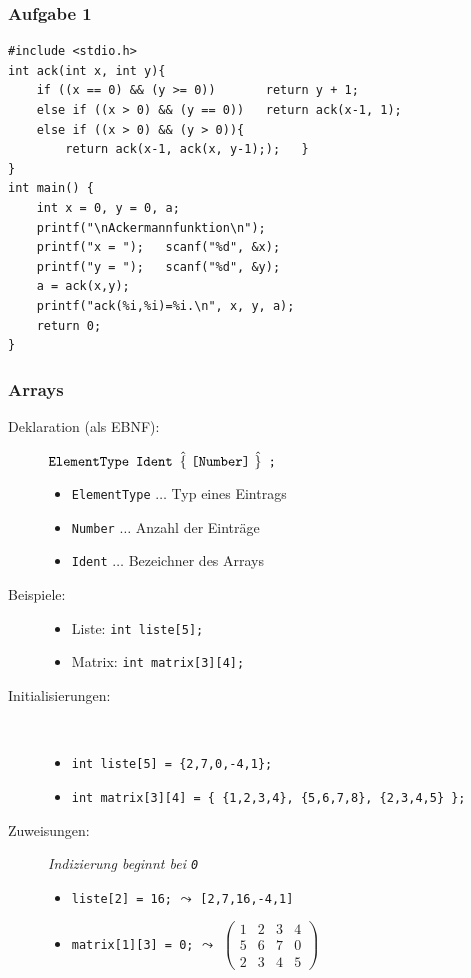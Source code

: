 \documentclass{beamer}
\begin{document}
\begin{frame}[fragile] \frametitle{Aufgabe 1}
	\footnotesize
\begin{lstlisting}
#include <stdio.h>
int ack(int x, int y){
	if ((x == 0) && (y >= 0))       return y + 1;
	else if ((x > 0) && (y == 0))   return ack(x-1, 1);
	else if ((x > 0) && (y > 0)){
		return ack(x-1, ack(x, y-1););   }
}
int main() {
	int x = 0, y = 0, a;
	printf("\nAckermannfunktion\n");
	printf("x = ");   scanf("%d", &x);
	printf("y = ");   scanf("%d", &y);
	a = ack(x,y);
	printf("ack(%i,%i)=%i.\n", x, y, a);
	return 0;
}
\end{lstlisting}
\end{frame}

\begin{frame}[fragile] \frametitle{Arrays}
	\small
	\begin{description}
		\item[Deklaration (als EBNF):]
		$\texttt{ElementType} \enskip \texttt{Ident} \enskip \hat{\{} \ \texttt{[} \texttt{Number} \texttt{]} \ \hat{\}}\enskip  \texttt{;}$
		\begin{itemize}
			\item \texttt{ElementType} $\dots$ Typ eines Eintrags
			\item \texttt{Number} $\dots$ Anzahl der Einträge
			\item \texttt{Ident} $\dots$ Bezeichner des Arrays
		\end{itemize}
		\pause
		\item[Beispiele:]
		\begin{itemize}
			\item Liste: \lstinline{int liste[5];}
			\item Matrix: \lstinline{int matrix[3][4];}
		\end{itemize}
		\pause
		\item[Initialisierungen:] ~
		\begin{itemize}
			\item \lstinline|int liste[5] = {2,7,0,-4,1};|
			\item \lstinline|int matrix[3][4] = { {1,2,3,4}, {5,6,7,8}, {2,3,4,5} };|
		\end{itemize}
		\pause
		\item[Zuweisungen:] \textit{Indizierung beginnt bei \texttt{0}}
		\begin{itemize}
			\item \lstinline{liste[2] = 16;} $\leadsto$ \lstinline{[2,7,16,-4,1]} 
			\item \lstinline{matrix[1][3] = 0;} $\leadsto$ $\left( \begin{smallmatrix} 1 & 2 & 3 & 4 \\ 5 & 6 & 7 & 0 \\ 2 & 3 & 4 & 5 \end{smallmatrix} \right)$
		\end{itemize}
	\end{description}
\end{frame}
\end{document}
